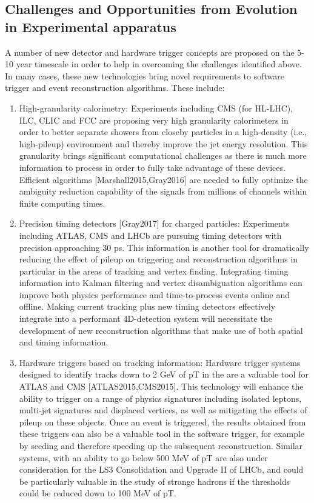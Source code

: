 \subsection{Challenges and Opportunities from Evolution in Experimental apparatus}

A number of new detector and hardware trigger concepts are proposed on the 5-10 year timescale in order to help in overcoming the challenges identified above. In many cases, these new technologies bring novel requirements to software trigger and event reconstruction algorithms. These include:
\begin{enumerate}
\item
High-granularity calorimetry: Experiments including CMS (for HL-LHC), ILC, CLIC and FCC are proposing very high granularity calorimeters in order to better separate showers from closeby particles in a high-density (i.e., high-pileup) environment and thereby improve the jet energy resolution. This granularity brings significant computational challenges as there is much more information to process in order to fully take advantage of these devices. Efficient algorithms [Marshall2015,Gray2016] are needed to fully optimize the ambiguity reduction capability of the signals from millions of channels within finite computing times. 

\item
Precision timing detectors [Gray2017] for charged particles: Experiments including ATLAS, CMS and LHCb are pursuing timing detectors with precision approaching 30 ps. This information is another tool for dramatically reducing the effect of pileup on triggering and reconstruction algorithms in particular in the areas of tracking and vertex finding. Integrating timing information into Kalman filtering and vertex disambiguation algorithms can improve both physics performance and time-to-process events online and offline. Making current tracking plus new timing detectors effectively integrate into a performant 4D-detection system will necessitate the development of new reconstruction algorithms that make use of both spatial and timing information. 

\item
Hardware triggers based on tracking information: Hardware trigger systems designed to identify tracks down to 2 GeV of pT in the are a valuable tool for ATLAS and CMS [ATLAS2015,CMS2015]. This technology will enhance the ability to trigger on a range of physics signatures including isolated leptons, multi-jet signatures and displaced vertices, as well as mitigating the effects of pileup on these objects. Once an event is triggered, the results obtained from these triggers can also be a valuable tool in the software trigger, for example by seeding and therefore speeding up the subsequent reconstruction. Similar systems, with an ability to go below 500 MeV of pT are also under consideration for the LS3 Consolidation and Upgrade II of LHCb, and could be particularly valuable in the study of strange hadrons if the thresholds could be reduced down to 100 MeV of pT.


\end{enumerate}
